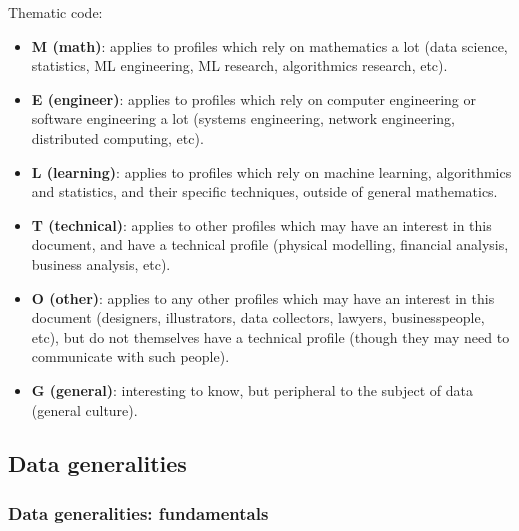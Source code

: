 \documentclass{article}
\begin{document}
Thematic code:

\begin{itemize}
	\item \textbf{M (math)}: applies to profiles which rely on mathematics a lot (data science, statistics, ML engineering, ML research, algorithmics research, etc).
	\item \textbf{E (engineer)}: applies to profiles which rely on computer engineering or software engineering a lot (systems engineering, network engineering, distributed computing, etc).
	\item \textbf{L (learning)}: applies to profiles which rely on machine learning, algorithmics and statistics, and their specific techniques, outside of general mathematics.
	\item \textbf{T (technical)}: applies to other profiles which may have an interest in this document, and have a technical profile (physical modelling, financial analysis, business analysis, etc).
	\item \textbf{O (other)}: applies to any other profiles which may have an interest in this document (designers, illustrators, data collectors, lawyers, businesspeople, etc), but do not themselves have a technical profile (though they may need to communicate with such people).
	\item \textbf{G (general)}: interesting to know, but peripheral to the subject of data (general culture).
\end{itemize}




\subsection*{Data generalities}

\subsubsection*{Data generalities: fundamentals}
\end{document}
